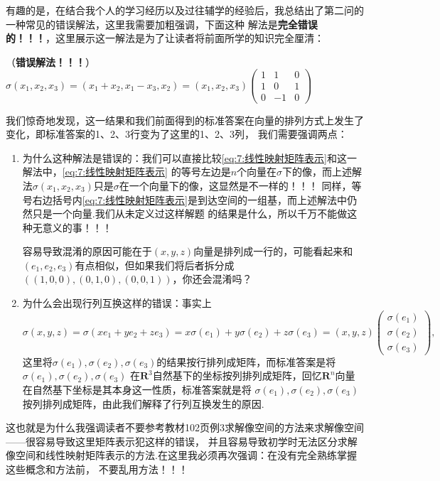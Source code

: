 有趣的是，在结合我个人的学习经历以及过往辅学的经验后，我总结出了第二问的一种常见的错误解法，这里我需要加粗强调，下面这种
解法是\textbf{完全错误的！！！}，这里展示这一解法是为了让读者将前面所学的知识完全厘清：

\begin{solution}
    （\textbf{错误解法！！！}）$\sigma(x_1,x_2,x_3)=(x_1+x_2,x_1-x_3, x_2)=(x_1,x_2,x_3)\begin{pmatrix}
        1 & 1 & 0 \\
        1 & 0 & 1 \\
        0 & -1 & 0
    \end{pmatrix}$
\end{solution}

我们惊奇地发现，这一结果和我们前面得到的标准答案在向量的排列方式上发生了变化，即标准答案的1、2、3行变为了这里的1、2、3列，
我们需要强调两点：
\begin{enumerate}
    \item 为什么这种解法是错误的：我们可以直接比较\autoref{eq:7:线性映射矩阵表示}和这一解法中，\autoref{eq:7:线性映射矩阵表示}
    的等号左边是$n$个向量在$\sigma$下的像，而上述解法$\sigma(x_1,x_2,x_3)$只是$\sigma$在一个向量下的像，这显然是不一样的！！！
    同样，等号右边括号内\autoref{eq:7:线性映射矩阵表示}是到达空间的一组基，而上述解法中仍然只是一个向量.我们从未定义过这样解题
    的结果是什么，所以千万不能做这种无意义的事！！！

    容易导致混淆的原因可能在于$(x,y,z)$向量是排列成一行的，可能看起来和$(e_1,e_2,e_3)$有点相似，但如果我们将后者拆分成
    $((1,0,0),(0,1,0),(0,0,1))$，你还会混淆吗？

    \item 为什么会出现行列互换这样的错误：事实上
    \[\sigma(x,y,z)=\sigma(xe_1+ye_2+ze_3)=x\sigma(e_1)+y\sigma(e_2)+z\sigma(e_3)=(x,y,z)\begin{pmatrix}
        \sigma(e_1) \\ \sigma(e_2) \\ \sigma(e_3)
    \end{pmatrix},\]
    这里将$\sigma(e_1),\sigma(e_2),\sigma(e_3)$的结果按行排列成矩阵，而标准答案是将$\sigma(e_1),\sigma(e_2),\sigma(e_3)$
    在$\mathbf{R}^3$自然基下的坐标按列排列成矩阵，回忆$\mathbf{R}^n$向量在自然基下坐标是其本身这一性质，标准答案就是将
    $\sigma(e_1),\sigma(e_2),\sigma(e_3)$按列排列成矩阵，由此我们解释了行列互换发生的原因.
\end{enumerate}

这也就是为什么我强调读者不要参考教材102页例3求解像空间的方法来求解像空间——很容易导致这里矩阵表示犯这样的错误，
并且容易导致初学时无法区分求解像空间和线性映射矩阵表示的方法.在这里我必须再次强调：在没有完全熟练掌握这些概念和方法前，
不要乱用方法！！！

